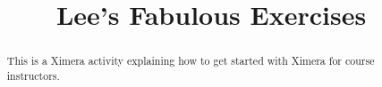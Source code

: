 \documentclass{xourse}
\title{Lee's Fabulous Exercises}%
\begin{document}
\begin{abstract} %

This is a Ximera activity explaining how to get started with Ximera for course instructors.

\end{abstract}

\maketitle


\end{document}
